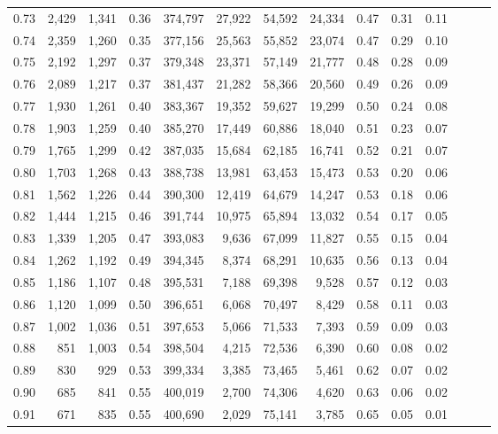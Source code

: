 \begin{tabular}{rrrrrrrrrrrrrr}
0.73 &  2,429 &  1,341 &  0.36 &  374,797 &   27,922 &  54,592 &  24,334 &  0.47 &  0.31 &      0.11 \\
0.74 &  2,359 &  1,260 &  0.35 &  377,156 &   25,563 &  55,852 &  23,074 &  0.47 &  0.29 &      0.10 \\
0.75 &  2,192 &  1,297 &  0.37 &  379,348 &   23,371 &  57,149 &  21,777 &  0.48 &  0.28 &      0.09 \\
0.76 &  2,089 &  1,217 &  0.37 &  381,437 &   21,282 &  58,366 &  20,560 &  0.49 &  0.26 &      0.09 \\
0.77 &  1,930 &  1,261 &  0.40 &  383,367 &   19,352 &  59,627 &  19,299 &  0.50 &  0.24 &      0.08 \\
0.78 &  1,903 &  1,259 &  0.40 &  385,270 &   17,449 &  60,886 &  18,040 &  0.51 &  0.23 &      0.07 \\
0.79 &  1,765 &  1,299 &  0.42 &  387,035 &   15,684 &  62,185 &  16,741 &  0.52 &  0.21 &      0.07 \\
0.80 &  1,703 &  1,268 &  0.43 &  388,738 &   13,981 &  63,453 &  15,473 &  0.53 &  0.20 &      0.06 \\
0.81 &  1,562 &  1,226 &  0.44 &  390,300 &   12,419 &  64,679 &  14,247 &  0.53 &  0.18 &      0.06 \\
0.82 &  1,444 &  1,215 &  0.46 &  391,744 &   10,975 &  65,894 &  13,032 &  0.54 &  0.17 &      0.05 \\
0.83 &  1,339 &  1,205 &  0.47 &  393,083 &    9,636 &  67,099 &  11,827 &  0.55 &  0.15 &      0.04 \\
0.84 &  1,262 &  1,192 &  0.49 &  394,345 &    8,374 &  68,291 &  10,635 &  0.56 &  0.13 &      0.04 \\
0.85 &  1,186 &  1,107 &  0.48 &  395,531 &    7,188 &  69,398 &   9,528 &  0.57 &  0.12 &      0.03 \\
0.86 &  1,120 &  1,099 &  0.50 &  396,651 &    6,068 &  70,497 &   8,429 &  0.58 &  0.11 &      0.03 \\
0.87 &  1,002 &  1,036 &  0.51 &  397,653 &    5,066 &  71,533 &   7,393 &  0.59 &  0.09 &      0.03 \\
0.88 &    851 &  1,003 &  0.54 &  398,504 &    4,215 &  72,536 &   6,390 &  0.60 &  0.08 &      0.02 \\
0.89 &    830 &    929 &  0.53 &  399,334 &    3,385 &  73,465 &   5,461 &  0.62 &  0.07 &      0.02 \\
0.90 &    685 &    841 &  0.55 &  400,019 &    2,700 &  74,306 &   4,620 &  0.63 &  0.06 &      0.02 \\
0.91 &    671 &    835 &  0.55 &  400,690 &    2,029 &  75,141 &   3,785 &  0.65 &  0.05 &      0.01 \\

\end{tabular}
